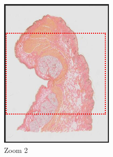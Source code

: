 \documentclass[a4paper,11pt]{report}
\numberwithin{figure}{section} %
\begin{document}
\begin{itemize}
\begin{figure}[H]
\begin{subfigure}[b]{0.3\textwidth}
            \includegraphics[width=\textwidth]{images/zooms2.png}
            \caption{Zoom 2}
            \end{subfigure}
            \begin{subfigure}[b]{0.3\textwidth}

\end{subfigure}
\end{figure}
\end{itemize}
\end{document}
